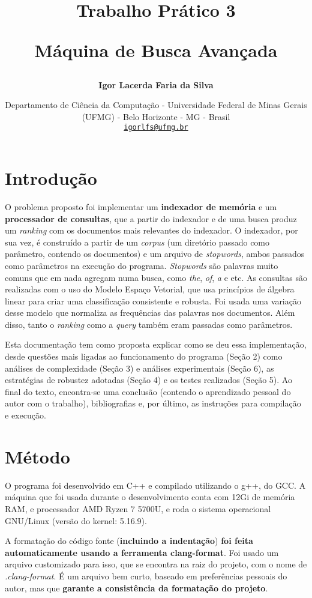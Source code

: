 \documentclass{article}
\author{\textbf{Igor Lacerda Faria da Silva} }
\title{\textbf{Trabalho Prático 3}

\textbf{Máquina de Busca Avançada}}
\date{%
    Departamento de Ciência da Computação - Universidade Federal de Minas Gerais (UFMG) - Belo Horizonte - MG - Brasil \\ [2ex]
    \href{mailto:igorlfs@ufmg.br}{\nolinkurl{igorlfs@ufmg.br}}
}
\begin{document}
\maketitle

\section{Introdução}

O problema proposto foi implementar um \textbf{indexador de memória} e um \textbf{processador de consultas}, que a partir do indexador e de uma busca produz um \textit{ranking} com os documentos mais relevantes do indexador. O indexador, por sua vez, é construído a partir de um \textit{corpus} (um diretório passado como parâmetro, contendo os documentos) e um arquivo de \textit{stopwords}, ambos passados como parâmetros na execução do programa. \textit{Stopwords} são palavras muito comuns que em nada agregam numa busca, como \textit{the}, \textit{of}, \textit{a} e etc. As consultas são realizadas com o uso do Modelo Espaço Vetorial, que usa princípios de álgebra linear para criar uma classificação consistente e robusta. Foi usada uma variação desse modelo que normaliza as frequências das palavras nos documentos. Além disso, tanto o \textit{ranking} como a \textit{query} também eram passadas como parâmetros.

Esta documentação tem como proposta explicar como se deu essa implementação, desde questões mais ligadas ao funcionamento do programa (Seção 2) como análises de complexidade (Seção 3) e análises experimentais (Seção 6), as estratégias de robustez adotadas (Seção 4) e os testes realizados (Seção 5). Ao final do texto, encontra-se uma conclusão (contendo o aprendizado pessoal do autor com o trabalho), bibliografias e, por último, as instruções para compilação e execução.

\section{Método}

O programa foi desenvolvido em C++ e compilado utilizando o g++, do GCC. A máquina que foi usada durante o desenvolvimento conta com 12Gi de memória RAM, e processador AMD Ryzen 7 5700U, e roda o sistema operacional GNU/Linux (versão do kernel: 5.16.9).

A formatação do código fonte (\textbf{incluindo a indentação}) \textbf{foi feita automaticamente usando a ferramenta clang-format}. Foi usado um arquivo customizado para isso, que se encontra na raiz do projeto, com o nome de \textit{.clang-format}. É um arquivo bem curto, baseado em preferências pessoais do autor, mas que \textbf{garante a consistência da formatação do projeto}.
\end{document}
